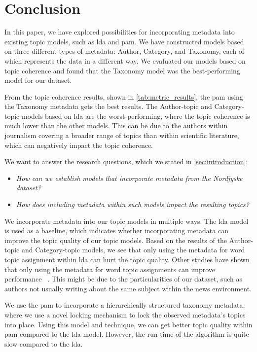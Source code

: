 \section{Conclusion}\label{sec:conclusion}
In this paper, we have explored possibilities for incorporating metadata into existing topic models, such as \gls{lda} and \gls{pam}.
We have constructed models based on three different types of metadata: Author, Category, and Taxonomy, each of which represents the data in a different way.
We evaluated our models based on topic coherence and found that the Taxonomy model was the best-performing model for our dataset.

From the topic coherence results, shown in \autoref{tab:metric_results}, the \acrfull{pam} using the Taxonomy metadata gets the best results.
The Author-topic and Category-topic models based on \gls{lda} are the worst-performing, where the topic coherence is much lower than the other models. 
This can be due to the authors within journalism covering a broader range of topics than within scientific literature, which can negatively impact the topic coherence.

We want to answer the research questions, which we stated in \autoref{sec:introduction}:

\begin{itemize}	
    \item \textit{How can we establish models that incorporate metadata from the Nordjyske dataset?}	
    \item \textit{How does including metadata within such models impact the resulting topics?}
 \end{itemize}

We incorporate metadata into our topic models in multiple ways.
The \gls{lda} model is used as a baseline, which indicates whether incorporating metadata can improve the topic quality of our topic models.
Based on the results of the Author-topic and Category-topic models, we see that only using the metadata for word topic assignment within \gls{lda} can hurt the topic quality.
Other studies have shown that only using the metadata for word topic assignments can improve performance~\cite{MetaLDA2017} \cite{author_topic_2012}.
This might be due to the particularities of our dataset, such as authors not usually writing about the same subject within the news environment.  


We use the \gls{pam} to incorporate a hierarchically structured taxonomy metadata, where we use a novel locking mechanism to lock the observed metadata's topics into place.
Using this model and technique, we can get better topic quality within \gls{pam} compared to the \gls{lda} model.
However, the run time of the algorithm is quite slow compared to the \gls{lda}.

